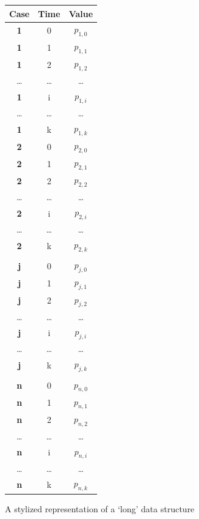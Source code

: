 \documentclass[a4paper,11pt]{book}
\begin{document}
\begin{figure}[!htbp]
	\centering
	\begin{tabular}{|c|c|c|}
		\hline
		\textbf{Case} & \textbf{Time} & \textbf{Value} \\ \hline
		\textbf{1}    & 0 & $p_{1,0}$  \\
		\textbf{1}    & 1 & $p_{1,1}$  \\
 		\textbf{1}    & 2 & $p_{1,2}$  \\
		\ldots & \ldots & \ldots \\
 		\textbf{1}    & i & $p_{1,i}$  \\
		\ldots & \ldots & \ldots \\
 		\textbf{1}    & k & $p_{1,k}$  \\ 
		\textbf{2}    & 0 & $p_{2,0}$  \\
		\textbf{2}    & 1 & $p_{2,1}$  \\
 		\textbf{2}    & 2 & $p_{2,2}$  \\
		\ldots & \ldots & \ldots \\
 		\textbf{2}    & i & $p_{2,i}$  \\
		\ldots & \ldots & \ldots \\
 		\textbf{2}    & k & $p_{2,k}$  \\ 
		\multicolumn{3}{c}{}\\
		\textbf{j}    & 0 & $p_{j,0}$  \\
		\textbf{j}    & 1 & $p_{j,1}$  \\
 		\textbf{j}    & 2 & $p_{j,2}$  \\
		\ldots & \ldots & \ldots \\
 		\textbf{j}    & i & $p_{j,i}$  \\
		\ldots & \ldots & \ldots \\
 		\textbf{j}    & k & $p_{j,k}$  \\ 
		\multicolumn{3}{c}{}\\
		\textbf{n}    & 0 & $p_{n,0}$  \\
		\textbf{n}    & 1 & $p_{n,1}$  \\
 		\textbf{n}    & 2 & $p_{n,2}$  \\
		\ldots & \ldots & \ldots \\
 		\textbf{n}    & i & $p_{n,i}$  \\
		\ldots & \ldots & \ldots \\
 		\textbf{n}    & k & $p_{n,k}$  \\ \hline
	\end{tabular}
	\caption{A stylized representation of a `long' data structure}
	\label{fig:long_dataframe}
\end{figure}
\clearpage
\end{document}

